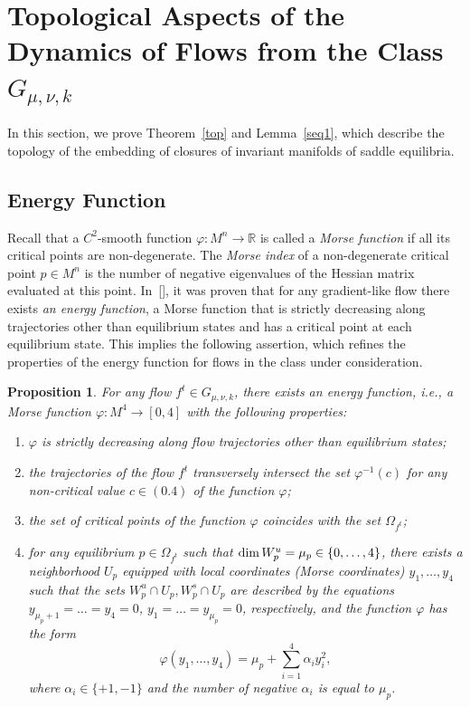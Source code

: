 \documentclass[%
 aip,
 amsmath,amssymb,
preprint,%
]{revtex4-1}
\newtheorem{propos}{Proposition}
\begin{document}
\section{Topological Aspects of the Dynamics of Flows from the Class $G_{\mu, \nu, k}$}\label{top_s}

In this section, we prove Theorem~\ref{top} and Lemma~\ref{seq1}, which describe the  topology of the  embedding of  closures of invariant manifolds of saddle equilibria.

\subsection{Energy Function}

Recall that a $C^2$-smooth function $\varphi: M^n\to \mathbb R$ is called a {\it Morse function} if all its critical points are non-degenerate. The {\it Morse index} of a non-degenerate critical point $p\in M^n$ is the number of negative eigenvalues of the Hessian matrix evaluated at this point.
In~[], it was proven that for any gradient-like flow  there exists {\it an energy function},  a Morse function that is  strictly decreasing along  trajectories other than equilibrium states and has a critical point at each equilibrium state. This implies the following assertion, which refines the properties of the energy function for flows in the class under consideration.


\begin{propos}\label{SM}
For any flow $f^t\in G_{\mu, \nu, k}$, there exists an energy function, i.e., a Morse function $\varphi: M^4\to [0,4]$ with the following properties:
\begin{enumerate}
\item $\varphi$ is strictly decreasing along flow trajectories other than equilibrium states;
\item the trajectories of the flow $f^t$ transversely intersect the set $\varphi^{-1}(c)$ for any non-critical value $c\in (0.4)$ of the function $\varphi$;
\item the set of critical points of the function $\varphi$ coincides with the set $\Omega_{f^t}$;
\item for any equilibrium $p\in \Omega_{f^t}$ such that ${\rm dim}\,W^u_p=\mu_p\in \{0,\dots, 4\}$,
there exists a neighborhood $U_p$ equipped with local coordinates (Morse coordinates) $y_1,\dots, y_4$ such that the sets $W^u_p\cap U_p, W^s_p\cap U_p$ are described by the equations
$y_{\mu_p+1}=\dots=y_4=0$, $y_1=\dots=y_{\mu_p}=0$, respectively, and the function $\varphi$ has the form 
$$\varphi(y_1,\dots, y_4)=\mu_p+\sum\limits_{i=1}^4\alpha_iy_i^2,$$
where $\alpha_i\in \{+1, -1\}$ and the number of negative $\alpha_i$ is equal to $\mu_p$.
\end{enumerate}
\end{propos}
\end{document}
